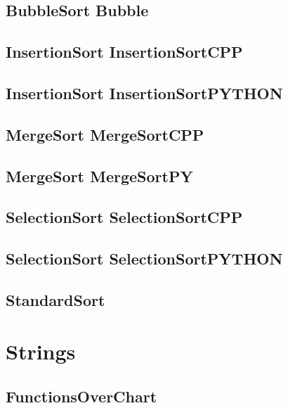 \subsection{BubbleSort Bubble}
\raggedbottom
\hrulefill
\subsection{InsertionSort InsertionSortCPP}
\raggedbottom
\hrulefill
\subsection{InsertionSort InsertionSortPYTHON}
\raggedbottom
\hrulefill
\subsection{MergeSort MergeSortCPP}
\raggedbottom
\hrulefill
\subsection{MergeSort MergeSortPY}
\raggedbottom
\hrulefill
\subsection{SelectionSort SelectionSortCPP}
\raggedbottom
\hrulefill
\subsection{SelectionSort SelectionSortPYTHON}
\raggedbottom
\hrulefill
\subsection{ StandardSort}
\raggedbottom
\hrulefill

\section{Strings}
\subsection{ FunctionsOverChart}
\raggedbottom
\hrulefill

